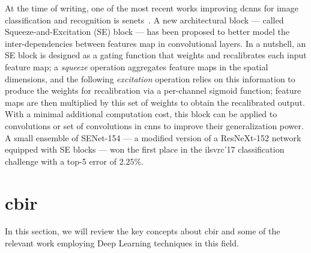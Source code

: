 At the time of writing, one of the most recent works improving \glspl{dcnn} for image classification and recognition is \glspl{senet}~\cite{hu2017squeeze}.
A new architectural block --- called Squeeze-and-Excitation (SE) block --- has been proposed to better model the inter-dependencies between features map in convolutional layers.
In a nutshell, an SE block is designed as a gating function that weights and recalibrates each input feature map;
a \emph{squeeze} operation aggregates feature maps in the spatial dimensions, and the following \emph{excitation} operation relies on this information to produce the weights for recalibration via a per-channel sigmoid function;
feature maps are then multiplied by this set of weights to obtain the recalibrated output.
With a minimal additional computation cost, this block can be applied to convolutions or set of convolutions in \glspl{cnn} to improve their generalization power.
A small ensemble of SENet-154 --- a modified version of a ResNeXt-152 network~\cite{xie2017aggregated} equipped with SE blocks --- won the first place in the \gls{ilsvrc}'17 classification challenge with a top-5 error of $2.25 \%$.




\section{\acrlong{cbir}}
\label{sec:back:image-retrieval}
In this section, we will review the key concepts about \acrlong{cbir} and some of the relevant work employing Deep Learning techniques in this field.

